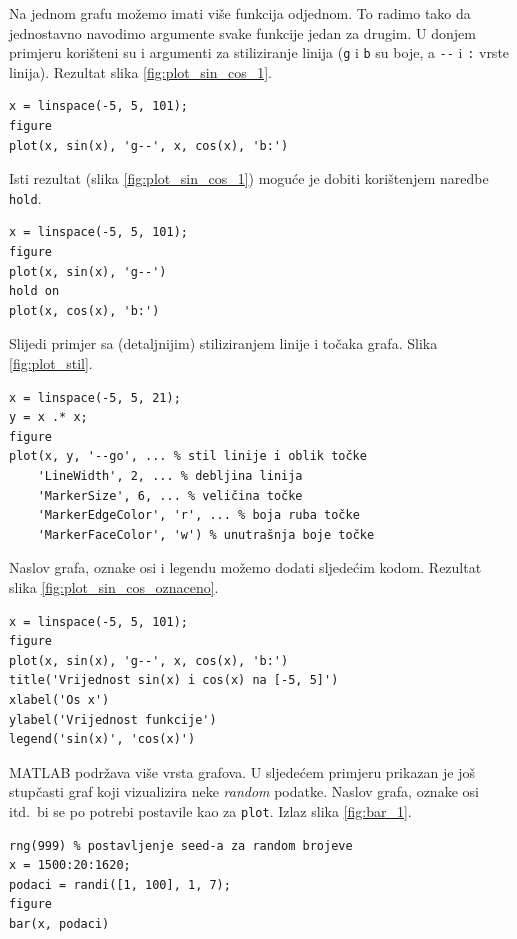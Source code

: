 \documentclass[a4paper, 10pt]{article}
\begin{document}
Na jednom grafu možemo imati više funkcija odjednom. To radimo tako da jednostavno navodimo argumente svake funkcije jedan za drugim. U donjem primjeru korišteni su i argumenti za stiliziranje linija (\texttt{g} i \texttt{b} su boje, a \texttt{-{}-} i \texttt{:} vrste linija). Rezultat slika \ref{fig:plot_sin_cos_1}.

\begin{lstlisting}
x = linspace(-5, 5, 101);
figure
plot(x, sin(x), 'g--', x, cos(x), 'b:')
\end{lstlisting}

Isti rezultat (slika \ref{fig:plot_sin_cos_1}) moguće je dobiti korištenjem naredbe \texttt{hold}.

\begin{lstlisting}
x = linspace(-5, 5, 101);
figure
plot(x, sin(x), 'g--')
hold on
plot(x, cos(x), 'b:')
\end{lstlisting}

Slijedi primjer sa (detaljnijim) stiliziranjem linije i točaka grafa. Slika \ref{fig:plot_stil}.

\begin{lstlisting}
x = linspace(-5, 5, 21);
y = x .* x;
figure
plot(x, y, '--go', ... % stil linije i oblik točke
    'LineWidth', 2, ... % debljina linija
    'MarkerSize', 6, ... % veličina točke
    'MarkerEdgeColor', 'r', ... % boja ruba točke
    'MarkerFaceColor', 'w') % unutrašnja boje točke
\end{lstlisting}

Naslov grafa, oznake osi i legendu možemo dodati sljedećim kodom. Rezultat slika \ref{fig:plot_sin_cos_oznaceno}.

\begin{lstlisting}
x = linspace(-5, 5, 101);
figure
plot(x, sin(x), 'g--', x, cos(x), 'b:')
title('Vrijednost sin(x) i cos(x) na [-5, 5]')
xlabel('Os x')
ylabel('Vrijednost funkcije')
legend('sin(x)', 'cos(x)')
\end{lstlisting}

MATLAB podržava više vrsta grafova. U sljedećem primjeru prikazan je još stupčasti graf koji vizualizira neke \textit{random} podatke. Naslov grafa, oznake osi itd.\ bi se po potrebi postavile kao za \texttt{plot}. Izlaz slika \ref{fig:bar_1}.

\begin{lstlisting}
rng(999) % postavljenje seed-a za random brojeve
x = 1500:20:1620;
podaci = randi([1, 100], 1, 7);
figure
bar(x, podaci)
\end{lstlisting}
\end{document}
